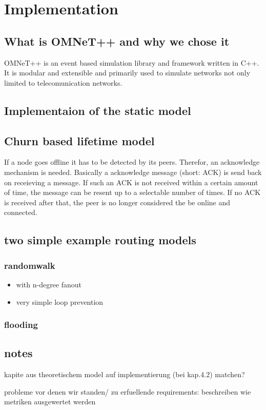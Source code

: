 \chapter{Implementation}

\section{What is OMNeT++ and why we chose it}

OMNeT++ is an event based simulation library and framework written in C++. It is modular and extensible and primarily used to simulate networks not only limited to telecomunication networks. 

\section{Implementaion of the static model}



\section{Churn based lifetime model}
If a node goes offline it has to be detected by its peers. Therefor, an acknowledge mechanism is needed. Basically a acknowledge message (short: ACK) is send back on receieving a message. If such an ACK is not received within a certain amount of time, the message can be resent up to a selectable number of times. If no ACK is received after that, the peer is no longer considered the be online and connected.
\section{two simple example routing models}
\subsection{randomwalk}
\begin{itemize}
\item            with n-degree fanout
\item            very simple loop prevention
\end{itemize}
\subsection{flooding}

\section{notes}
kapite aus theoretischem model auf implementierung (bei kap.4.2) matchen?

probleme vor denen wir standen/ zu erfuellende requirements: beschreiben wie metriken ausgewertet werden
